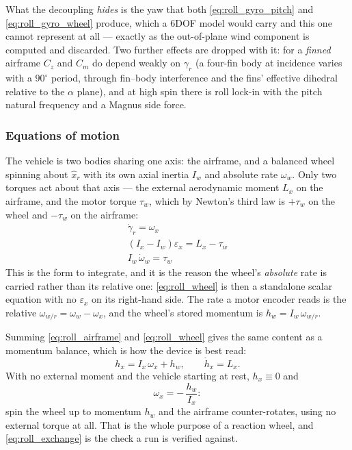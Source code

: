 \begin{aitext}
What the decoupling \emph{hides} is the yaw that both
\autoref{eq:roll_gyro_pitch} and \autoref{eq:roll_gyro_wheel} produce, which a 6DOF model would
carry and this one cannot represent at all --- exactly as the out-of-plane wind component is
computed and discarded. Two further effects are dropped with it: for a \emph{finned} airframe
$C_z$ and $C_m$ do depend weakly on $\gamma_r$ (a four-fin body at incidence varies with a
$90^\circ$ period, through fin--body interference and the fins' effective dihedral relative to the
$\alpha$ plane), and at high spin there is roll lock-in with the pitch natural frequency and a
Magnus side force.

\subsubsection{Equations of motion}\label{sec:roll_eom}
The vehicle is two bodies sharing one axis: the airframe, and a balanced wheel spinning about
$\hat{x}_r$ with its own axial inertia $I_w$ and absolute rate $\omega_w$. Only two torques act
about that axis --- the external aerodynamic moment $L_x$ on the airframe, and the motor torque
$\tau_w$, which by Newton's third law is $+\tau_w$ on the wheel and $-\tau_w$ on the airframe:
\begin{gather}
    \dot\gamma_r = \omega_x \label{eq:roll_kinematics} \\
    \left(I_x-I_w\right)\varepsilon_x = L_x - \tau_w \label{eq:roll_airframe} \\
    I_w\,\dot\omega_w = \tau_w \label{eq:roll_wheel}
\end{gather}
This is the form to integrate, and it is the reason the wheel's \emph{absolute} rate is carried
rather than its relative one: \autoref{eq:roll_wheel} is then a standalone scalar equation with no
$\varepsilon_x$ on its right-hand side. The rate a motor encoder reads is the relative
$\omega_{w/r}=\omega_w-\omega_x$, and the wheel's stored momentum is $h_w=I_w\,\omega_{w/r}$.

Summing \autoref{eq:roll_airframe} and \autoref{eq:roll_wheel} gives the same content as a
momentum balance, which is how the device is best read:
\begin{equation} \label{eq:roll_momentum}
    h_x = I_x\,\omega_x + h_w, \qquad \dot h_x = L_x.
\end{equation}
With no external moment and the vehicle starting at rest, $h_x\equiv0$ and
\begin{equation} \label{eq:roll_exchange}
    \omega_x = -\,\frac{h_w}{I_x}:
\end{equation}
spin the wheel up to momentum $h_w$ and the airframe counter-rotates, using no external torque at
all. That is the whole purpose of a reaction wheel, and \autoref{eq:roll_exchange} is the check a
run is verified against.


\end{aitext}
